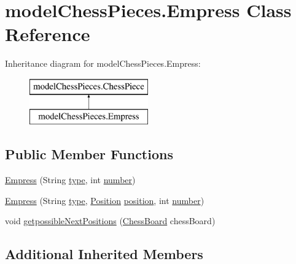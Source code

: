 \hypertarget{classmodel_chess_pieces_1_1_empress}{\section{model\+Chess\+Pieces.\+Empress Class Reference}
\label{classmodel_chess_pieces_1_1_empress}
}
Inheritance diagram for model\+Chess\+Pieces.\+Empress\+:\begin{figure}[H]
\begin{center}
\leavevmode
\includegraphics[height=2.000000cm]{classmodel_chess_pieces_1_1_empress}
\end{center}
\end{figure}
\subsection*{Public Member Functions}
\begin{DoxyCompactItemize}
\item 
\hyperlink{classmodel_chess_pieces_1_1_empress_a6e3bd690dae8ab6f26ece63c27f0e144}{Empress} (String \hyperlink{classmodel_chess_pieces_1_1_chess_piece_a195487ca88c197af7c1604247be31db2}{type}, int \hyperlink{classmodel_chess_pieces_1_1_chess_piece_a979e63b99128333883acedc38d25dc87}{number})
\item 
\hyperlink{classmodel_chess_pieces_1_1_empress_ac38cc0d134a721d07434d3d9b9793e30}{Empress} (String \hyperlink{classmodel_chess_pieces_1_1_chess_piece_a195487ca88c197af7c1604247be31db2}{type}, \hyperlink{classmodel_core_1_1_position}{Position} \hyperlink{classmodel_chess_pieces_1_1_chess_piece_a3d4362d5b28f6edb14161196d9c6807d}{position}, int \hyperlink{classmodel_chess_pieces_1_1_chess_piece_a979e63b99128333883acedc38d25dc87}{number})
\item 
void \hyperlink{classmodel_chess_pieces_1_1_empress_a9836219f1e3cb7ce9e809a63256192d0}{getpossible\+Next\+Positions} (\hyperlink{classmodel_core_1_1_chess_board}{Chess\+Board} chess\+Board)
\end{DoxyCompactItemize}
\subsection*{Additional Inherited Members}


